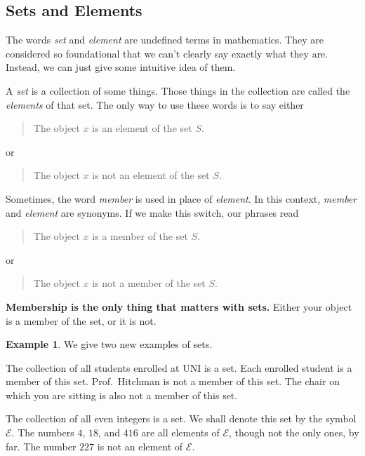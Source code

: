 \documentclass[12pt,letterpaper]{article}
\theoremstyle{definition}
\newtheorem{example}{Example}
\begin{document}
\subsection*{Sets and Elements}

The words \emph{set} and \emph{element} are undefined terms in mathematics.
They are considered so foundational that we can't clearly say exactly what they are.
Instead, we can just give some intuitive idea of them.

A \emph{set} is a collection of some things. Those things in the collection are called the \emph{elements} of that set.
The only way to use these words is to say either
\begin{quote}
The object $x$ is an element of the set $S$.
\end{quote}
or
\begin{quote}
The object $x$ is not an element of the set $S$.
\end{quote}

\clearpage

Sometimes, the word \emph{member} is used in place of \emph{element}. 
In this context, \emph{member} and \emph{element} are synonyms.
If we make this switch, our phrases read
\begin{quote}
The object $x$ is a member of the set $S$.
\end{quote}
or
\begin{quote}
The object $x$ is not a member of the set $S$.
\end{quote}
\textbf{Membership is the only thing that matters with sets.} Either your object is a member of the set, or it is not.

\begin{example} We give two new examples of sets.
\begin{compactitem}
\item The collection of all students enrolled at UNI is a set.
Each enrolled student is a member of this set.
Prof.~Hitchman is not a member of this set.
The chair on which you are sitting is also not a member of this set.

\item The collection of all even integers is a set. We shall denote this set by the symbol $\mathcal{E}$.
The numbers $4$, $18$, and $416$ are all elements of $\mathcal{E}$, though not the only ones, by far. 
The number $227$ is not an element of $\mathcal{E}$.
\end{compactitem}
\end{example}
\end{document}
